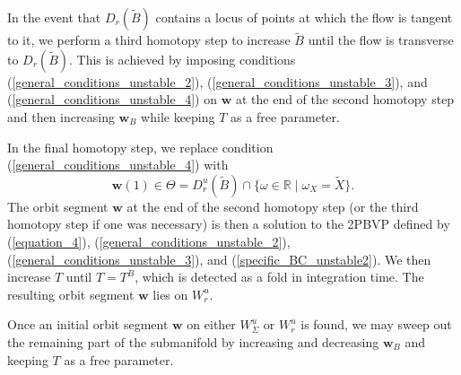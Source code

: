 \documentclass{ws-ijbc}
\begin{document}
In the event that $D_r(\widetilde{B})$ contains a locus of points at which the flow is tangent to it, we perform a third homotopy step to increase $\widetilde{B}$ until the flow is transverse to $D_r(\widetilde{B})$.  This is achieved by imposing conditions (\ref{general_conditions_unstable_2}), (\ref{general_conditions_unstable_3}), and (\ref{general_conditions_unstable_4}) on $\mathbf{w}$ at the end of the second homotopy step and then increasing $\mathbf{w}_B$ while keeping $T$ as a free parameter.

In the final homotopy step, we replace condition (\ref{general_conditions_unstable_4}) with 
	\begin{equation}
		\mathbf{w}(1) \in \Theta = D^u_r(\widetilde{B}) \cap \{ \omega \in \mathbb{R} \; | \; \omega_X = \widetilde{X} \}.
		\label{specific_BC_unstable2}
	\end{equation}
The orbit segment $\mathbf{w}$ at the end of the second homotopy step (or the third homotopy step if one was necessary) is then a solution to the 2PBVP defined by (\ref{equation_4}), (\ref{general_conditions_unstable_2}), (\ref{general_conditions_unstable_3}), and (\ref{specific_BC_unstable2}).    We then increase $T$ until $T=T^B$, which is detected as a fold in integration time.  The resulting orbit segment $\mathbf{w}$ lies on $W^u_r$.

Once an initial orbit segment $\mathbf{w}$ on either $W^u_\Sigma$ or $W^u_r$ is found, we may sweep out the remaining part of the submanifold by increasing and decreasing $\mathbf{w}_B$ and keeping $T$ as a free parameter.
\end{document}

